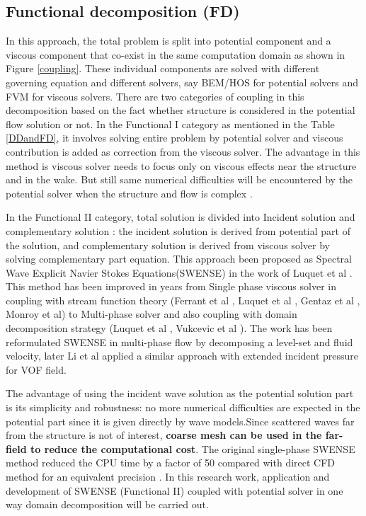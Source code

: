 \documentclass[preprint,12pt]{article}
\begin{document}
{\subsection{Functional decomposition (FD)}
In this approach, the total problem is split into potential component and a viscous component that co-exist in the same computation domain as shown in Figure \ref{coupling}. These individual components are solved with different governing equation and different solvers, say BEM/HOS for potential solvers and FVM for viscous solvers. There are two categories of coupling in this decomposition based on the fact whether structure is considered in the potential flow solution or not. In the Functional I category as mentioned in the Table \ref{DDandFD}, it involves solving entire problem by potential solver and viscous contribution is added as correction from the viscous solver. The advantage in this method is viscous solver needs to focus only on viscous effects near the structure and in the wake. But still same numerical difficulties will be encountered by the potential solver when the structure and flow is complex . \par
In the Functional II category, total solution is divided into Incident solution and complementary solution : the incident solution is derived from potential part of the solution, and complementary solution is derived from viscous solver by solving complementary part equation. This approach been proposed as Spectral Wave Explicit Navier Stokes Equations(SWENSE) in the work of Luquet et al \cite{Luquet2007}. This method has been improved in years from Single phase viscous solver in coupling with stream function theory (Ferrant et al \cite{Ferrant2002}, Luquet et al \cite{Luquet2003}, Gentaz et al \cite{Gentaz2004}, Monroy et al\cite{Monroy2010}) to Multi-phase solver and also coupling with domain decomposition strategy (Luquet et al \cite{Luquet2007}, Vukcevic et al \cite{Vukcevic2016}). The work has been reformulated SWENSE in multi-phase flow by decomposing a level-set and fluid velocity, later Li et al \cite{zhaobin_progress} applied a similar approach with extended incident pressure for VOF field. \par

The advantage of using the incident wave solution as the potential solution part is its simplicity and robustness: no more numerical difficulties are expected in the potential part since it is given directly by wave models.Since scattered waves far from the structure is not of interest, \textbf{coarse mesh can be used in the far-field to reduce the computational cost}. The original single-phase SWENSE method reduced the CPU time by a factor of 50 compared with direct CFD method for an equivalent precision \cite{Gentaz2004}.  In this research work, application and development of SWENSE (Functional II) coupled with potential solver in one way domain decomposition will be carried out.



}
\end{document}
